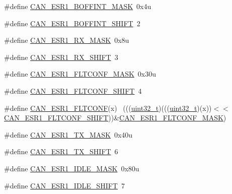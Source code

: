 \begin{DoxyCompactItemize}
\item 
\#define \hyperlink{group___c_a_n___register___masks_ga0f997f1d2ad00476745755aa74ce5084}{C\+A\+N\+\_\+\+E\+S\+R1\+\_\+\+B\+O\+F\+F\+I\+N\+T\+\_\+\+M\+A\+SK}~0x4u
\item 
\#define \hyperlink{group___c_a_n___register___masks_ga5e04e60e6627e38eaf02023308703a2e}{C\+A\+N\+\_\+\+E\+S\+R1\+\_\+\+B\+O\+F\+F\+I\+N\+T\+\_\+\+S\+H\+I\+FT}~2
\item 
\#define \hyperlink{group___c_a_n___register___masks_ga246ad2ff9dd50d1d6b931b5e42ef90b3}{C\+A\+N\+\_\+\+E\+S\+R1\+\_\+\+R\+X\+\_\+\+M\+A\+SK}~0x8u
\item 
\#define \hyperlink{group___c_a_n___register___masks_ga5f5f765579cea7bfb561f84e62b96623}{C\+A\+N\+\_\+\+E\+S\+R1\+\_\+\+R\+X\+\_\+\+S\+H\+I\+FT}~3
\item 
\#define \hyperlink{group___c_a_n___register___masks_ga6c81fa9d3bec21a97a304319968216a8}{C\+A\+N\+\_\+\+E\+S\+R1\+\_\+\+F\+L\+T\+C\+O\+N\+F\+\_\+\+M\+A\+SK}~0x30u
\item 
\#define \hyperlink{group___c_a_n___register___masks_gadb93c702b83c1240d7b1a07fba1b33a3}{C\+A\+N\+\_\+\+E\+S\+R1\+\_\+\+F\+L\+T\+C\+O\+N\+F\+\_\+\+S\+H\+I\+FT}~4
\item 
\#define \hyperlink{group___c_a_n___register___masks_ga660b16c6a75cea6de61b6e6f37cc43ee}{C\+A\+N\+\_\+\+E\+S\+R1\+\_\+\+F\+L\+T\+C\+O\+NF}(x)                                        ~(((\hyperlink{_p_e___types_8h_a33594304e786b158f3fb30289278f5af}{uint32\+\_\+t})(((\hyperlink{_p_e___types_8h_a33594304e786b158f3fb30289278f5af}{uint32\+\_\+t})(x))$<$$<$\hyperlink{group___c_a_n___register___masks_gadb93c702b83c1240d7b1a07fba1b33a3}{C\+A\+N\+\_\+\+E\+S\+R1\+\_\+\+F\+L\+T\+C\+O\+N\+F\+\_\+\+S\+H\+I\+FT}))\&\hyperlink{group___c_a_n___register___masks_ga6c81fa9d3bec21a97a304319968216a8}{C\+A\+N\+\_\+\+E\+S\+R1\+\_\+\+F\+L\+T\+C\+O\+N\+F\+\_\+\+M\+A\+SK})
\item 
\#define \hyperlink{group___c_a_n___register___masks_ga29052f7ad6fc3da4cbcd9dce8ffa59f5}{C\+A\+N\+\_\+\+E\+S\+R1\+\_\+\+T\+X\+\_\+\+M\+A\+SK}~0x40u
\item 
\#define \hyperlink{group___c_a_n___register___masks_ga054c570f7af7ef5b09d3d5f5b3edaa3e}{C\+A\+N\+\_\+\+E\+S\+R1\+\_\+\+T\+X\+\_\+\+S\+H\+I\+FT}~6
\item 
\#define \hyperlink{group___c_a_n___register___masks_ga68402932c750edd9ad719585c3be03d2}{C\+A\+N\+\_\+\+E\+S\+R1\+\_\+\+I\+D\+L\+E\+\_\+\+M\+A\+SK}~0x80u
\item 
\#define \hyperlink{group___c_a_n___register___masks_ga1eccf60cd0f2bf9a3a426f1ff05f8869}{C\+A\+N\+\_\+\+E\+S\+R1\+\_\+\+I\+D\+L\+E\+\_\+\+S\+H\+I\+FT}~7
$$
\end{DoxyCompactItemize}
